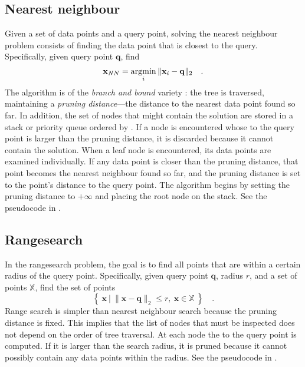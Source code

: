 \subsection{Nearest neighbour}

Given a set of data points and a query point, solving the nearest neighbour
problem consists of finding the data point that is closest to the query.
Specifically, given query point $\mathbf{q}$, find
\begin{equation}
\mathbf{x}_{\mathit NN} = \operatorname*{argmin}_{i} \| \mathbf{x}_i - \mathbf{q} \|_{2} \quad .
\end{equation}
The algorithm is of the \emph{branch and bound} variety
\cite{land1960}: the tree is traversed, maintaining a \emph{pruning
distance}---the distance to the nearest data point found so far.  In
addition, the set of nodes that might contain the solution are stored
in a stack or priority queue ordered by \mindist.  If a node is
encountered whose \mindist to the query point is larger than the
pruning distance, it is discarded because it cannot contain the
solution.  When a leaf node is encountered, its data points are
examined individually.  If any data point is closer than the pruning
distance, that point becomes the nearest neighbour found so far, and
the pruning distance is set to the point's distance to the query
point.  The algorithm begins by setting the pruning distance to
$+\infty$ and placing the root node on the stack.  See the pseudocode
in .


\subsection{Rangesearch}

In the rangesearch problem, the goal is to find all points that are
within a certain radius of the query point.  Specifically, given query
point $\mathbf{q}$, radius $r$, and a set of points $\mathbb{X}$, find
the set of points
\begin{equation}
\left\{
 \ \mathbf{x}
\ \Big| \ \| \mathbf{x} - \mathbf{q} \|_{2} \le r,\ \mathbf{x}\in\mathbb{X} \
\right\}
\quad .
\end{equation}
Range search is simpler than nearest neighbour search because the
pruning distance is fixed.  This implies that the list of nodes that
must be inspected does not depend on the order of tree traversal.  At
each node the \mindist to the query point is computed.  If it is
larger than the search radius, it is pruned because it cannot possibly
contain any data points within the radius.  See the pseudocode
in .


